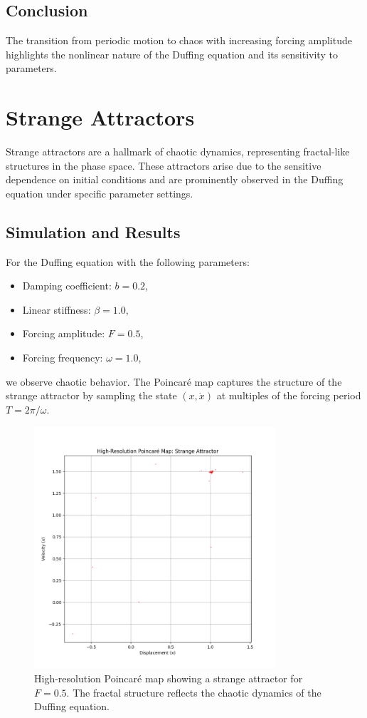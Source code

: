 \documentclass[11pt]{article}
\begin{document}
\subsection*{Conclusion}
The transition from periodic motion to chaos with increasing forcing amplitude highlights the nonlinear nature of the Duffing equation and its sensitivity to parameters.

\section*{Strange Attractors}
Strange attractors are a hallmark of chaotic dynamics, representing fractal-like structures in the phase space. These attractors arise due to the sensitive dependence on initial conditions and are prominently observed in the Duffing equation under specific parameter settings.

\subsection*{Simulation and Results}
For the Duffing equation with the following parameters:
\begin{itemize}
    \item Damping coefficient: \(b = 0.2\),
    \item Linear stiffness: \(\beta = 1.0\),
    \item Forcing amplitude: \(F = 0.5\),
    \item Forcing frequency: \(\omega = 1.0\),
\end{itemize}
we observe chaotic behavior. The Poincaré map captures the structure of the strange attractor by sampling the state \((x, \dot{x})\) at multiples of the forcing period \(T = 2\pi / \omega\).

\begin{figure}[h!]
    \centering
    \includegraphics[width=0.8\textwidth]{strange_attractor_poincare_map.png}
    \caption{High-resolution Poincaré map showing a strange attractor for \(F = 0.5\). The fractal structure reflects the chaotic dynamics of the Duffing equation.}
    \label{fig:strange_attractor}
\end{figure}
\end{document}
